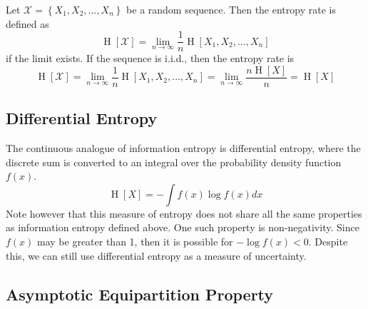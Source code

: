 \documentclass[11pt]{report} %
\begin{document}
Let $\mathcal{X} = \left\{X_{1}, X_{2}, \dots, X_{n}\right\}$ be a random sequence. Then the entropy rate is defined as
\begin{equation}
\operatorname{H}\left[\mathcal{X}\right] = \lim_{n\to\infty}\dfrac{1}{n}\operatorname{H}\left[X_{1}, X_{2}, \dots, X_{n}\right]
\end{equation}
if the limit exists. If the sequence is i.i.d., then the entropy rate is
\begin{equation}
\operatorname{H}\left[\mathcal{X}\right] = \lim_{n\to\infty}\dfrac{1}{n}\operatorname{H}\left[X_{1}, X_{2}, \dots, X_{n}\right] = \lim_{n\to\infty}\dfrac{n\operatorname{H}\left[X\right]}{n} = \operatorname{H}\left[X\right]
\end{equation}

\subsection{Differential Entropy}

The continuous analogue of information entropy is differential entropy, where the discrete sum is converted to an integral over the probability density function $f\left(x\right)$.
\begin{equation}
\operatorname{H}\left[X\right] = -\int f\left(x\right)\log f\left(x\right) dx
\end{equation}
Note however that this measure of entropy does not share all the same properties as information entropy defined above. One such property is non-negativity. Since $f\left(x\right)$ may be greater than 1, then it is possible for $-\log f\left(x\right) < 0$. Despite this, we can still use differential entropy as a measure of uncertainty.

\subsection{Asymptotic Equipartition Property}
\end{document}
